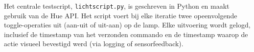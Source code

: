 Het centrale testscript, \texttt{lichtscript.py}, is geschreven in Python en maakt gebruik van de Hue API. Het script voert bij elke iteratie twee opeenvolgende toggle-operaties uit (aan-uit of uit-aan) op de lamp. Elke uitvoering wordt gelogd, inclusief de timestamp van het verzonden commando en de timestamp waarop de actie visueel bevestigd werd (via logging of sensorfeedback).

%    
%    
%    
%    
%    
%    
%    
%    
%    
%    
%    

